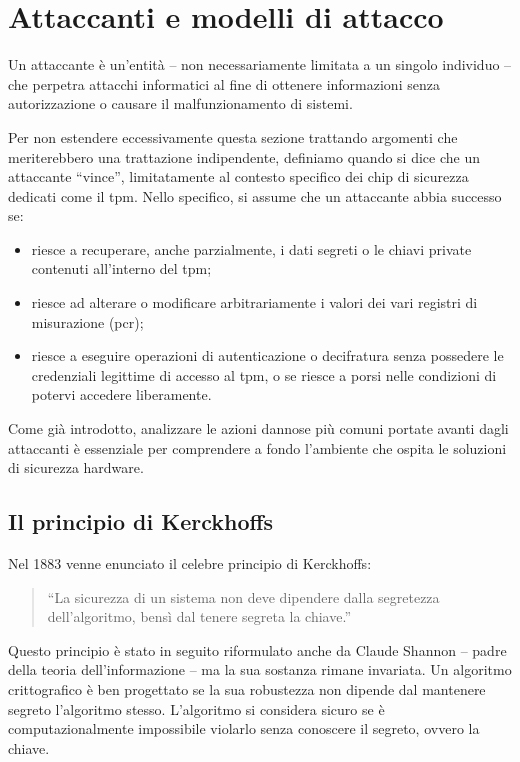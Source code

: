 \section{Attaccanti e modelli di attacco}\label{sec:attaccanti_modelli}
Un attaccante è un'entità -- non necessariamente limitata a un singolo individuo -- che perpetra attacchi informatici al fine di ottenere informazioni senza autorizzazione o causare il malfunzionamento di sistemi.

Per non estendere eccessivamente questa sezione trattando argomenti che meriterebbero una trattazione indipendente, definiamo quando si dice che un attaccante \enquote{vince}, limitatamente al contesto specifico dei chip di sicurezza dedicati come il \acrshort{tpm}. Nello specifico, si assume che un attaccante abbia successo se:
\begin{itemize}
    \item riesce a recuperare, anche parzialmente, i dati segreti o le chiavi private contenuti all'interno del \acrshort{tpm};
    \item riesce ad alterare o modificare arbitrariamente i valori dei vari registri di misurazione (\acrfull{pcr});
    \item riesce a eseguire operazioni di autenticazione o decifratura senza possedere le credenziali legittime di accesso al \acrshort{tpm}, o se riesce a porsi nelle condizioni di potervi accedere liberamente.
\end{itemize}

Come già introdotto, analizzare le azioni dannose più comuni portate avanti dagli attaccanti è essenziale per comprendere a fondo l'ambiente che ospita le soluzioni di sicurezza hardware.

\clearpage
\subsection{Il principio di Kerckhoffs}\label{subsec:kerckhoffs}
Nel 1883 venne enunciato il celebre principio di Kerckhoffs:
\begin{quote}
    \enquote{La sicurezza di un sistema non deve dipendere dalla segretezza dell'algoritmo, bensì dal tenere segreta la chiave.}
\end{quote}

Questo principio è stato in seguito riformulato anche da Claude Shannon -- padre della teoria dell'informazione -- ma la sua sostanza rimane invariata. Un algoritmo crittografico è ben progettato se la sua robustezza non dipende dal mantenere segreto l'algoritmo stesso. L'algoritmo si considera sicuro se è computazionalmente impossibile violarlo senza conoscere il segreto, ovvero la chiave.


